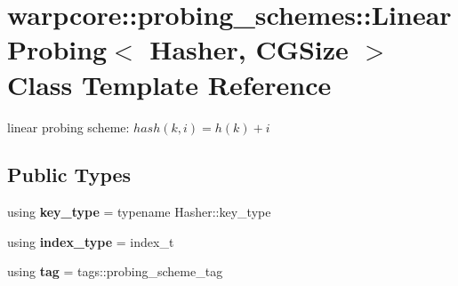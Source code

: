 \hypertarget{classwarpcore_1_1probing__schemes_1_1LinearProbing}{}\section{warpcore\+:\+:probing\+\_\+schemes\+:\+:Linear\+Probing$<$ Hasher, C\+G\+Size $>$ Class Template Reference}
\label{classwarpcore_1_1probing__schemes_1_1LinearProbing}


linear probing scheme\+: $hash(k,i) = h(k)+i$  


\subsection*{Public Types}
\begin{DoxyCompactItemize}
\item 
\mbox{\label{classwarpcore_1_1probing__schemes_1_1LinearProbing_a1397e29f9b9d241e1c9deb6ff412b447}} 
using {\bfseries key\+\_\+type} = typename Hasher\+::key\+\_\+type
\item 
\mbox{\label{classwarpcore_1_1probing__schemes_1_1LinearProbing_a5e13def23b2072873b9233f630b74db8}} 
using {\bfseries index\+\_\+type} = index\+\_\+t
\item 
\mbox{\label{classwarpcore_1_1probing__schemes_1_1LinearProbing_ac859921bb5763eaa886c819973ea8082}} 
using {\bfseries tag} = tags\+::probing\+\_\+scheme\+\_\+tag
\end{DoxyCompactItemize}
